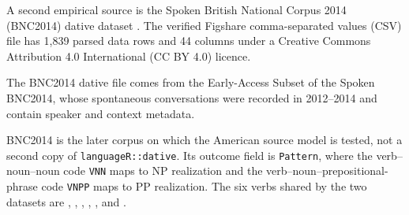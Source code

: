 A second empirical source is the Spoken British National Corpus 2014 (BNC2014)
dative dataset
\citep{JensetMcGillivray2018BNCData,JensetMcGillivray2019Dative}. The verified
Figshare comma-separated values (CSV) file has 1,839 parsed data rows and 44
columns under a Creative Commons Attribution 4.0 International (CC BY 4.0)
licence.

The BNC2014 dative file comes from the Early-Access Subset of the Spoken
BNC2014, whose spontaneous conversations were recorded in 2012--2014 and
contain speaker and context metadata.

BNC2014 is the later corpus on which the American source model is tested, not a
second copy of \texttt{languageR::dative}. Its outcome field is
\texttt{Pattern}, where the verb--noun--noun code \texttt{VNN} maps to NP
realization and the verb--noun--prepositional-phrase code \texttt{VNPP} maps to
PP realization. The six verbs shared by the two datasets are ,
, , , , and
.
